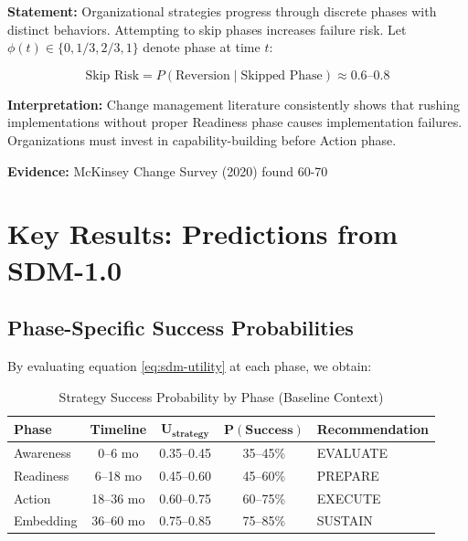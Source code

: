 \begin{tcolorbox}[colback=gray!5!white, colframe=gray!75!black,
    title=Axiom SDM-3: Phase Progression]

\textbf{Statement:} Organizational strategies progress through discrete phases with distinct behaviors. Attempting to skip phases increases failure risk. Let $\phi(t) \in \{0, 1/3, 2/3, 1\}$ denote phase at time $t$:

\begin{equation}
\text{Skip Risk} = P(\text{Reversion} \mid \text{Skipped Phase}) \approx 0.6 \text{--} 0.8
\end{equation}

\textbf{Interpretation:} Change management literature consistently shows that rushing implementations without proper Readiness phase causes implementation failures. Organizations must invest in capability-building before Action phase.

\textbf{Evidence:} McKinsey Change Survey (2020) found 60-70%

\end{tcolorbox}

\section{Key Results: Predictions from SDM-1.0}
\label{sec:sdm-results}

\subsection{Phase-Specific Success Probabilities}

By evaluating equation \ref{eq:sdm-utility} at each phase, we obtain:

\begin{table}[htbp]
\centering
\caption{Strategy Success Probability by Phase (Baseline Context)}
\label{tab:sdm-predictions}
\renewcommand{\arraystretch}{1.4}
\begin{tabular}{@{}lcccl@{}}
\toprule
\textbf{Phase} & \textbf{Timeline} & $\mathbf{U_{\text{strategy}}}$ & $\mathbf{P(\text{Success})}$ & \textbf{Recommendation} \\
\midrule
Awareness & 0--6 mo & 0.35--0.45 & 35--45\% & EVALUATE \\
Readiness & 6--18 mo & 0.45--0.60 & 45--60\% & PREPARE \\
Action & 18--36 mo & 0.60--0.75 & 60--75\% & EXECUTE \\
Embedding & 36--60 mo & 0.75--0.85 & 75--85\% & SUSTAIN \\
\bottomrule
\end{tabular}
\end{table}

